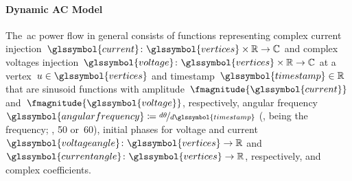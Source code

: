\paragraph{Dynamic AC Model}
% 
The~\gls{ac} power flow in general consists of functions representing complex
current
injection~$\glssymbol{current}\colon\glssymbol{vertices}\times\reals\to\complexes$
and complex voltages injection~$\glssymbol{voltage}\colon
\glssymbol{vertices}\times\reals\to\complexes$ at a
vertex~$\vertexa\in\glssymbol{vertices}$ and timestamp~$\glssymbol{timestamp}\in\reals$ that are
sinusoid functions with amplitude~$\fmagnitude{\glssymbol{current}}$ and~$
\fmagnitude{\glssymbol{voltage}}$, respectively, angular
frequency~$\glssymbol{angularfrequency}\coloneqq\nicefrac{d\aangle}
{d\glssymbol{timestamp}}$ (\ie,  being the frequency; \eg,
\SI{50}{} or~\SI{60}{}), initial phases for
voltage and
current~$\glssymbol{voltageangle}\colon\glssymbol{vertices}\to\reals$
and~$\glssymbol{currentangle}\colon\glssymbol{vertices}\to\reals$, respectively,
and complex coefficients. 

